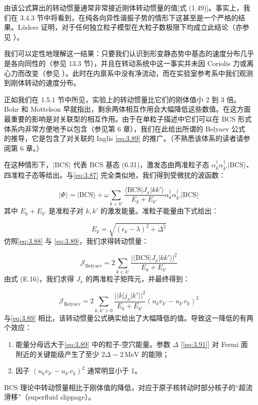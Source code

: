 由该公式算出的转动惯量通常非常接近刚体转动惯量的值{[}式 (1.49){]}。事实上，我们在 3.4.3 节中将看到，在纯各向异性谐振子势的情形下这甚至是一个严格的结果。Lüders
\cite{Lu60} 证明，对于任何独立粒子模型在大粒子数极限下均成立此结论（亦参见 \cite{AB59,Ro59,SB64,Da75,KG78}）。

我们可以定性地理解这一结果：只要我们认识到形变静态势中基态的速度分布几乎是各向同性的（参见 13.3 节），并且在转动系统中这一事实并未因
Coriolis 力或离心力而改变（参见 \cite{BJ76b}）。此时在内禀系中没有净流动，而在实验室参考系中我们观测到刚体转动的速度分布。

正如我们在 1.5.1 节中所见，实验上的转动惯量比它们的刚体值小 2 到 3 倍。Bohr 和 Mottelson \cite{BM55,Mo56}
早就指出，剩余两体相互作用会大幅降低这些数值。在这方面最重要的影响是对关联型的相互作用。由于在单粒子描述中它们可以在 BCS 形式体系内非常方便地予以包含（参见第
6 章），我们在此给出所谓的 Belyaev 公式 \cite{Be59,Be61} 的推导，它是包含了对关联的 Inglis \ref{eq:3.89}
的推广。（不熟悉该体系的读者请参阅第 6 章。）

在这种情形下，$|\text{BCS}\rangle$ 代表 BCS 基态 (6.31)，激发态由两准粒子态 $\alpha^{\dagger}_{k}\alpha^{\dagger}_{k'}|\text{BCS}\rangle$、四准粒子态等给出。与\ref{eq:3.87}
完全类似地，我们得到受微扰的波函数：

\begin{equation}
|\Phi\rangle=|\text{BCS}\rangle+\omega\sum_{k<k'}\frac{\langle\text{BCS}|J_{x}|kk'\rangle}{E_{k}+E_{k'}}\alpha^{\dagger}_{k}\alpha^{\dagger}_{k'}|\text{BCS}\rangle\label{eq:3.90}
\end{equation}
其中 $E_{k}+E_{k'}$ 是准粒子对 $k,k'$ 的激发能量。准粒子能量由下式给出：

\begin{equation}
E_{k}=\sqrt{(\epsilon_{k}-\lambda)^{2}+\Delta^{2}}\label{eq:3.91}
\end{equation}
仿照\ref{eq:3.88} 与 \ref{eq:3.89}，我们求得转动惯量：

\begin{equation}
\mathcal{J}_{\text{Belyaev}}=2\sum_{k<k'}\frac{|\langle\text{BCS}|J_{x}|kk'\rangle|^{2}}{E_{k}+E_{k'}}\label{eq:3.92}
\end{equation}
由式 (E.16)，我们求得 $J_{x}$ 的两准粒子矩阵元，并最终得到：

\begin{equation}
\mathcal{J}_{\text{Belyaev}}=2\sum_{k,k'>0}\frac{|\langle k|j_{x}|k'\rangle|^{2}}{E_{k}+E_{k'}}\left(u_{k}v_{k'}-u_{k'}v_{k}\right)^{2}\label{eq:3.93}
\end{equation}
与\ref{eq:3.89} 相比，该转动惯量公式确实给出了大幅降低的值。导致这一降低的有两个效应：
\begin{enumerate}
\item[(i)] 能量分母远大于\ref{eq:3.89} 中的粒子-空穴能量。参数 $\Delta$ {[}\ref{eq:3.91}{]}
对 Fermi 面附近的关键能级产生了至少 $2\Delta\sim2\,\text{MeV}$ 的能隙；
\item[(ii)] 因子 $(u_{k}v_{k'}-u_{k'}v_{k})^{2}$ 通常明显小于 1。
\end{enumerate}
BCS 理论中转动惯量相比于刚体值的降低，对应于原子核转动时部分核子的“超流滑移”（superfluid slippage）\cite{Mi59,Mi60}。

